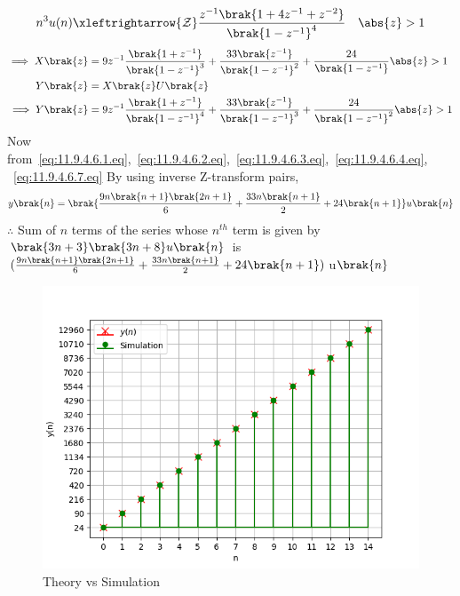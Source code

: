 \documentclass[journal,12pt,onecolumn]{IEEEtran}
\theoremstyle{remark}
\begin{document}
\begin{equation}
n^3u(n) \xleftrightarrow{\mathcal{Z}} \frac{z^{-1}\brak{1+4z^{-1}+z^{-2}}}{\brak{1-z^{-1}}^4} \quad \abs{z}>1 \\ \label{eq:11.9.4.6.4.eq}
\end{equation} 
\begin{align}
            \implies X\brak{z}&=9z^{-1}\frac{\brak{1+z^{-1}}}{\brak{1-z^{-1}}^3} + \frac{33\brak{z^{-1}}}{\brak{1-z^{-1}}^2} +\frac{24}{\brak{1-z^{-1}}} \abs{z}>1    \label{eq:11.9.4.6.5.eq}\\
            Y\brak{z} &= X\brak{z}U\brak{z} \label{eq:11.9.4.6.6.eq} \\
              \implies Y\brak{z}&= 9z^{-1}\frac{\brak{1+z^{-1}}}{\brak{1-z^{-1}}^4} + \frac{33\brak{z^{-1}}}{\brak{1-z^{-1}}^3} +\frac{24}{\brak{1-z^{-1}}^2} \abs{z}>1  \label{eq:11.9.4.6.7.eq}
        \end{align}
        Now from~\eqref{eq:11.9.4.6.1.eq},~\eqref{eq:11.9.4.6.2.eq},~\eqref{eq:11.9.4.6.3.eq},~\eqref{eq:11.9.4.6.4.eq},
 ~\eqref{eq:11.9.4.6.7.eq} By using  inverse Z-transform pairs,
 \begin{align}
            y\brak{n}= \brak{\frac{9n\brak{n+1}\brak{2n+1}}{6}+\frac{33n\brak{n+1}}{2}+24\brak{n+1}}u\brak{n}
        \end{align}
        $\therefore$ Sum of $n$ terms of the series whose $n^{th}$ term is given by $\brak{3n+3}\brak{3n+8}u\brak{n}$ is $(\frac{9n\brak{n+1}\brak{2n+1}}{6}+\frac{33n\brak{n+1}}{2}+24\brak{n+1})$u$\brak{n}$
        \begin{figure}[h]
    \centering
 \includegraphics[width=\columnwidth]{ncert-maths/11/9/4/6/figs/plot.png}    
 \caption{Theory vs Simulation}
\end{figure}
\end{document}
